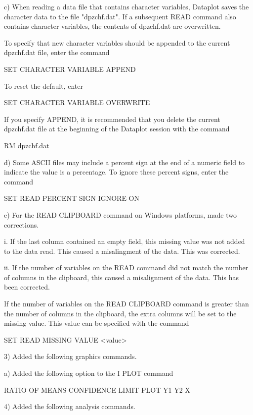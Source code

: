     c) When reading a data file that contains character variables,
       Dataplot saves the character data to the file "dpzchf.dat".
       If a subsequent READ command also contains character variables,
       the contents of dpzchf.dat are overwritten.

       To specify that new character variables should be appended to
       the current dpzchf.dat file, enter the command

           SET CHARACTER VARIABLE APPEND

       To reset the default, enter

           SET CHARACTER VARIABLE OVERWRITE

       If you specify APPEND, it is recommended that you delete the
       current dpzchf.dat file at the beginning of the Dataplot session
       with the command

           RM dpzchf.dat

    d) Some ASCII files may include a percent sign at the end of a
       numeric field to indicate the value is a percentage.  To ignore
       these percent signs, enter the command

           SET READ PERCENT SIGN IGNORE ON

    e) For the READ CLIPBOARD command on Windows platforms, made two
       corrections.

         i. If the last column contained an empty field, this missing
            value was not added to the data read.  This caused a
            misalingment of the data.  This was corrected.

        ii. If the number of variables on the READ command did not
            match the number of columns in the clipboard, this caused a
            misalignment of the data.  This has been corrected.

            If the number of variables on the READ CLIPBOARD command is
            greater than the number of columns in the clipboard, the
            extra columns will be set to the missing value.  This value
            can be specified with the command

                SET READ MISSING VALUE <value>

 3) Added the following graphics commands.

    a) Added the following option to the I PLOT command

          RATIO OF MEANS CONFIDENCE LIMIT PLOT Y1 Y2 X

 4) Added the following analysis commands.


